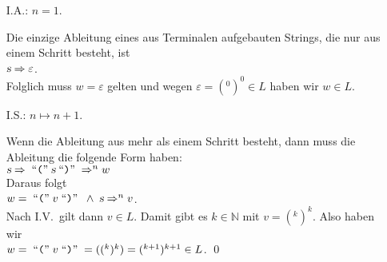 \begin{enumerate}
\item[I.A.:] $n = 1$.
  
            Die einzige Ableitung eines aus Terminalen aufgebauten Strings, die nur aus 
            einem Schritt besteht, ist
            \\[0.2cm]
            \hspace*{1.3cm}
            $\textsl{s} \Rightarrow \varepsilon$.
            \\[0.2cm]
            Folglich muss $w = \varepsilon$ gelten und wegen $\varepsilon = (^0)^0 \in L$
            haben wir $w \in L$.
\item[I.S.:] $n \mapsto n+1$.

            Wenn die Ableitung aus mehr als einem Schritt besteht, dann muss die Ableitung
            die folgende Form haben:
            \\[0.2cm]
            \hspace*{1.3cm}
            $\textsl{s} \Rightarrow \;\mbox{``\texttt{(}''}\; \textsl{s} \;\mbox{``\texttt{)}''}\; \Rightarrow^n w$
            \\[0.2cm]
            Daraus folgt
            \\[0.2cm]
            \hspace*{1.3cm}
            $w = \;\mbox{``\texttt{(}''}\;v\;\mbox{``\texttt{)}''}\; \;\wedge\; \textsl{s} \Rightarrow^n v$.
            \\[0.2cm]
            Nach I.V.~gilt dann $v \in L$.  Damit gibt es $k \in \mathbb{N}$ mit $v = (^k)^k$.
            Also haben wir
            \\[0.2cm]
            \hspace*{1.3cm}
            $w = \;\mbox{``\texttt{(}''}\;v\;\mbox{``\texttt{)}''}\; = 
((^k)^k) = (^{k+1})^{k+1} \in L$. \qed
\end{enumerate}


